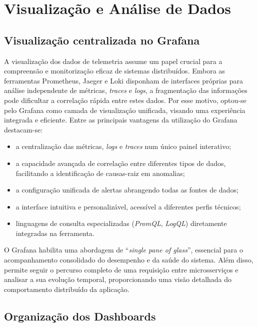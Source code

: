 \chapter{Visualização e Análise de Dados}

\section{Visualização centralizada no Grafana}

A visualização dos dados de telemetria assume um papel crucial para a compreensão e monitorização eficaz de sistemas distribuídos. Embora as ferramentas Prometheus, Jaeger e Loki disponham de interfaces próprias para análise independente de métricas, \textit{traces} e \textit{logs}, a fragmentação das informações pode dificultar a correlação rápida entre estes dados. Por esse motivo, optou-se pelo Grafana como camada de visualização unificada, visando uma experiência integrada e eficiente. Entre as principais vantagens da utilização do Grafana destacam-se:

\begin{itemize}
\item a centralização das métricas, \textit{logs} e \textit{traces} num único painel interativo;
\item a capacidade avançada de correlação entre diferentes tipos de dados, facilitando a identificação de causas-raiz em anomalias;
\item a configuração unificada de alertas abrangendo todas as fontes de dados;
\item a interface intuitiva e personalizável, acessível a diferentes perfis técnicos;
\item linguagens de consulta especializadas (\textit{PromQL}, \textit{LogQL}) diretamente integradas na ferramenta.
\end{itemize}

O Grafana habilita uma abordagem de ``\textit{single pane of glass}'', essencial para o acompanhamento consolidado do desempenho e da saúde do sistema. Além disso, permite seguir o percurso completo de uma requisição entre microsserviços e analisar a sua evolução temporal, proporcionando uma visão detalhada do comportamento distribuído da aplicação.



\break

\section{Organização dos Dashboards}

